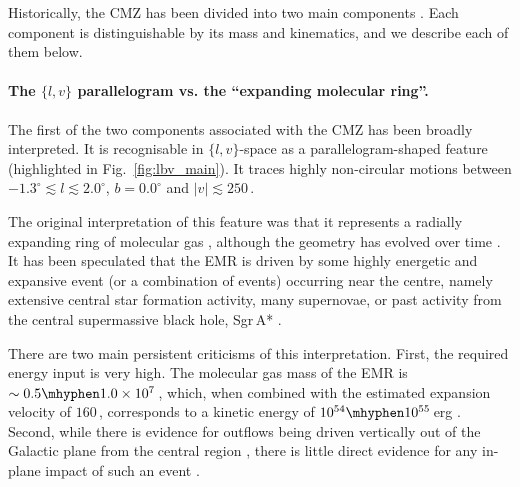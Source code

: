 Historically, the CMZ has been divided into two main components \citep{Morris1996,Fux1999}. Each component is distinguishable by its mass and kinematics, and we describe each of them below. 


 
\paragraph{The $\{l,v\}$ parallelogram vs. the ``expanding molecular ring''.}\label{subsubsec:180pcring} The first of the two components associated with the CMZ has been broadly interpreted. It is recognisable in $\{l,v\}$-space as a parallelogram-shaped feature (highlighted in Fig.~\ref{fig:lbv_main}). It traces highly non-circular motions between $-1.3^{\circ}\lesssim l \lesssim 2.0^{\circ}$, $b=0.0^{\circ}$ and $|v|\lesssim250$\,\kms. 

The original interpretation of this feature was that it represents a radially expanding ring of molecular gas \citep[sometimes referred to as the expanding molecular ring, EMR, or the ``$180$\,pc expanding ring'';][]{Scoville1972, Kaifu1972, sofue1995b, Oka2020}, although the geometry has evolved over time \citep{Sofue2017a}. It has been speculated that the EMR is driven by some highly energetic and expansive event (or a combination of events) occurring near the centre, namely extensive central star formation activity, many supernovae, or past activity from the central supermassive black hole, Sgr\,A* \citep{Sofue2017a}. 

There are two main persistent criticisms of this interpretation. First, the required energy input is very high. The molecular gas mass of the EMR is $\sim0.5\mhyphen1.0\times10^{7}$\,\msun, which, when combined with the estimated expansion velocity of $160$\,\kms, corresponds to a kinetic energy of $10^{54}\mhyphen10^{55}$\,erg \citep[roughly the equivalent of $10^{3}\mhyphen10^{4}$ supernovae][]{Scoville1972, sofue1995b, Sofue2017a, Oka2019}. Second, while there is evidence for outflows being driven vertically out of the Galactic plane from the central region \citep[][see \S\ref{sec:feedback}]{Bland-Hawthorn2003, Su2010, Heywood2019, Heywood2022}, there is little direct evidence for any in-plane impact of such an event \citep[][]{Combes1991}.

